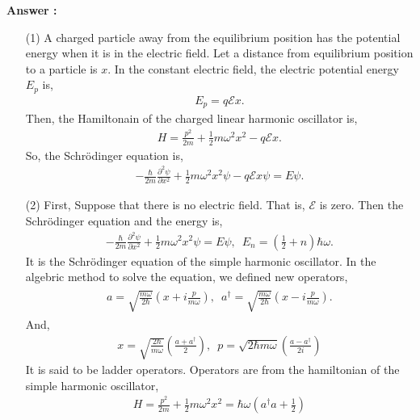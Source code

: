 \documentclass[floatfix,nofootinbib,superscriptaddress,fleqn]{revtex4-2}
\begin{document}
\noindent \textbf{Answer : }
\begin{itemize}
  \item[(1)] A charged particle away from the equilibrium position 
  has the potential energy when it is in the electric field. 
  Let a distance from equilibrium position to a particle is $x$.
  In the constant electric field, the electric potential energy $E_p$ is,
  \begin{align}
    E_p = q\mathcal{E}x.
  \end{align} 
  Then, the Hamiltonain of the charged linear
  harmonic oscillator is,
  \begin{align}\label{eq:1-1}
    H = \frac{p^2}{2m}+\frac{1}{2}m\omega^2x^2-q\mathcal{E}x.
  \end{align}
  So, the Schr\"odinger equation is,
  \begin{align}\label{eq:1-2}
    -\frac{\hbar}{2m}\frac{\partial^2\psi}{\partial x^2}
    +\frac{1}{2}m\omega^2x^2\psi
    -q\mathcal{E}x\psi = E\psi.
  \end{align}
  \item[(2)] First, Suppose that there is no electric field.
  That is, $\mathcal{E}$ is zero. Then the Schr\"odinger equation and 
  the energy is,
  \begin{align}
    -\frac{\hbar}{2m}\frac{\partial^2\psi}{\partial x^2}
    +\frac{1}{2}m\omega^2x^2\psi = E\psi,\,\,\, 
    E_n = \left(\frac{1}{2}+n\right)\hbar\omega.
  \end{align}
  It is the Schr\"odinger equation of the simple harmonic oscillator. 
  In the algebric method to solve the equation, 
  we defined new operators,
  \begin{align}
    \begin{split}
      a = \sqrt{\frac{m\omega}{2\hbar}}\left(x+i\frac{p}{m\omega}\right),\,\,\,
      a^\dagger = \sqrt{\frac{m\omega}{2\hbar}}\left(x-i\frac{p}{m\omega}\right). 
    \end{split}
  \end{align}
  And,
  \begin{align}
    x = \sqrt{\frac{2\hbar}{m\omega}}\left(\frac{a+a^\dagger}{2}\right),\,\,\,
    p = \sqrt{2\hbar m\omega}\left(\frac{a-a^\dagger}{2i}\right)
  \end{align}
  It is said to be ladder operators. Operators are from the hamiltonian of 
  the simple harmonic oscillator,
  \begin{align}\label{eq:1-3}
    H = \frac{p^2}{2m}+\frac{1}{2}m\omega^2x^2 
    = \hbar\omega\left(a^\dagger a + \frac{1}{2}\right)

\end{align}
\end{itemize}
\end{document}

